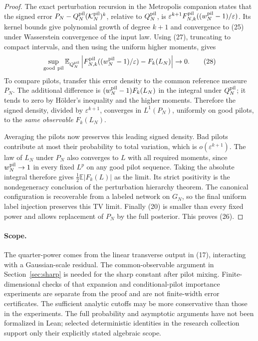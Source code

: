 \documentclass[11pt]{article}
\newcommand{\E}{\mathbb E}\newcommand{\R}{\mathbb R}
\begin{document}
\begin{proof}
The exact perturbation recursion in the Metropolis companion states
that the signed error $P_N-Q_N^{\rm pil}(\mathcal K_N^{\rm pil})^k$,
relative to $Q_N^{\rm pil}$, is
$\varepsilon^{k+1}F_{N,k}^{\rm pil}((w_N^{\rm pil}-1)/\varepsilon)$.
Its kernel bounds give polynomial growth of degree $k+1$ and convergence
to (25) under Wasserstein convergence of the input law. Using (27),
truncating to compact intervals, and then using the uniform higher
moments, gives
\[
 \sup_{\rm good\ pil}\E_{Q_N^{\rm pil}}
 \left|F_{N,k}^{\rm pil}((w_N^{\rm pil}-1)/\varepsilon)
                                      -F_k(L_N)\right|\to0. \tag{28}
\]
To compare pilots, transfer this error density to the common reference
measure $P_N$. The additional difference is
$(w_N^{\rm pil}-1)F_k(L_N)$ in the integral under $Q_N^{\rm pil}$;
it tends to zero by H\"older's inequality and the higher moments.
Therefore the signed density, divided by $\varepsilon^{k+1}$, converges
in $L^1(P_N)$, uniformly on good pilots, to the \emph{same observable}
$F_k(L_N)$.

Averaging the pilots now preserves this leading signed density. Bad
pilots contribute at most their probability to total variation, which
is $o(\varepsilon^{k+1})$. The law of $L_N$ under $P_N$ also converges
to $L$ with all required moments, since $w_N^{\rm pil}\to1$ in every
fixed $L^p$ on any good pilot sequence. Taking the absolute integral
therefore gives $\tfrac12\E|F_k(L)|$ as the limit. Its strict positivity
is the nondegeneracy conclusion of the perturbation hierarchy theorem.
The canonical configuration is recoverable from a labeled network on
$G_N$, so the final uniform label injection preserves this TV limit.
Finally (20) is smaller than every fixed power and allows replacement
of $P_N$ by the full posterior. This proves (26).
\end{proof}

\paragraph{Scope.}
The quarter-power comes from the linear transverse output in (17),
interacting with a Gaussian-scale residual. The common-observable
argument in Section~\ref{sec:sharp} is needed for the sharp constant
after pilot mixing. Finite-dimensional checks of that expansion and
conditional-pilot importance experiments are separate from the proof
and are not finite-width error certificates.
The sufficient analytic cutoffs may be more conservative than those in
the experiments. The full probability and asymptotic arguments have not
been formalized in Lean; selected deterministic identities in the
research collection support only their explicitly stated algebraic scope.
\end{document}
